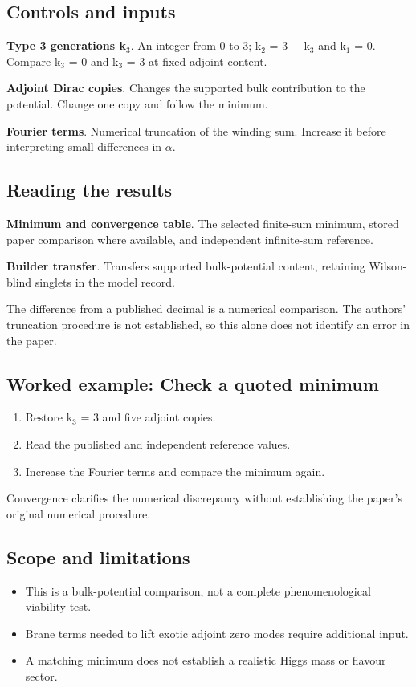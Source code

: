 \documentclass[11pt,a4paper]{article}
\begin{document}
\subsection*{Controls and inputs}
\textbf{Type 3 generations k\ensuremath{{}_{3}}}. An integer from 0 to 3; k\ensuremath{{}_{2}} = 3 \ensuremath{-} k\ensuremath{{}_{3}} and k\ensuremath{{}_{1}} = 0. Compare k\ensuremath{{}_{3}} = 0 and k\ensuremath{{}_{3}} = 3 at fixed adjoint content.

\textbf{Adjoint Dirac copies}. Changes the supported bulk contribution to the potential. Change one copy and follow the minimum.

\textbf{Fourier terms}. Numerical truncation of the winding sum. Increase it before interpreting small differences in \ensuremath{\alpha}.

\subsection*{Reading the results}
\textbf{Minimum and convergence table}. The selected finite-sum minimum, stored paper comparison where available, and independent infinite-sum reference.

\textbf{Builder transfer}. Transfers supported bulk-potential content, retaining Wilson-blind singlets in the model record.

The difference from a published decimal is a numerical comparison. The authors' truncation procedure is not established, so this alone does not identify an error in the paper.
\subsection*{Worked example: Check a quoted minimum}
\begin{enumerate}
\item Restore k\ensuremath{{}_{3}} = 3 and five adjoint copies.
\item Read the published and independent reference values.
\item Increase the Fourier terms and compare the minimum again.
\end{enumerate}
Convergence clarifies the numerical discrepancy without establishing the paper's original numerical procedure.
\subsection*{Scope and limitations}
\begin{itemize}
\item This is a bulk-potential comparison, not a complete phenomenological viability test.
\item Brane terms needed to lift exotic adjoint zero modes require additional input.
\item A matching minimum does not establish a realistic Higgs mass or flavour sector.
\end{itemize}
\end{document}
